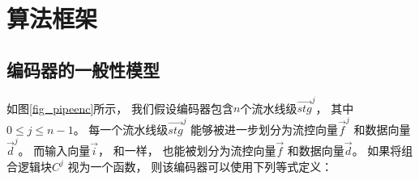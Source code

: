 %
%
%
%
%
%
%


\section{算法框架}\label{sec_framework}


\subsection{编码器的一般性模型}
如图\ref{fig_pipeenc}所示，
我们假设编码器包含$n$个流水线级$\vec{stg}^j$，
其中$0\le j \le n-1$。
每一个流水线级$\vec{stg}^j$ 能够被进一步划分为流控向量$\vec{f}^j$ 和数据向量$\vec{d}^j$。
而输入向量$\vec{i}$，
和一样，
也能被划分为流控向量$\vec{f}$ 和数据向量$\vec{d}$。
如果将组合逻辑块$C^j$ 视为一个函数，
则该编码器可以使用下列等式定义：

